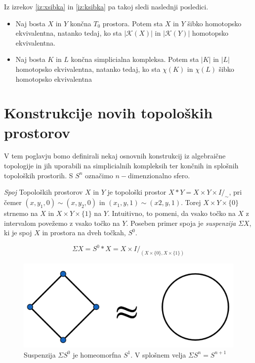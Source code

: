 \documentclass[mat1]{fmfdelo}
\begin{document}
Iz izrekov \ref{iz:xsibka} in \ref{iz:ksibka} pa takoj sledi naslednji posledici.

\begin{posledica}
    \begin{itemize}

        \item Naj bosta $X$ in $Y$ končna $T_0$ prostora. Potem sta $X$ in $Y$ šibko homotopsko ekvivalentna, natanko tedaj, ko sta $|\mathcal{K}(X)|$ in $|\mathcal{K}(Y)|$ homotopsko ekvivalentna.
        \item Naj bosta $K$ in $L$ končna simplicialna kompleksa. Potem sta $|K|$ in $|L|$ homotopsko ekvivalentna, natanko tedaj, ko sta $\chi(K)$ in $\chi(L)$ šibko homotopsko ekvivalentna
    \end{itemize}
\end{posledica}

\section{Konstrukcije novih topoloških prostorov}


V tem poglavju bomo definirali nekaj osnovnih konstrukcij iz algebraične topologije in jih uporabili na simplicialnih kompleksih ter končnih in splošnih topoloških prostorih. S $S^n$ označimo $n-$dimenzionalno sfero.

\textit{Spoj} Topoloških prostorov $X$ in $Y$ je topološki prostor $X\ast Y = X\times Y 
\times I /_{\sim}$, pri čemer $(x, y_1, 0) \sim (x, y_2, 0)$ in  $(x_1, y, 1) \sim (x2, y, 1)$. 
Torej $X\times Y\times \{0\}$ strnemo na $X$ in $X\times Y\times \{1\}$ na $Y$. Intuitivno, 
to pomeni, da vsako točko na $X$ z intervalom povežemo z vsako točko na $Y$.
Poseben primer spoja je \textit{suspenzija} $\Sigma X$, ki je spoj $X$ in prostora na dveh točkah, $S^0$.

$$
\Sigma X=S^0\ast X = X\times I /_{(X\times \{0\},X\times \{1\})}
$$

\begin{figure}[h]
    \centering
    \includegraphics[width=0.6\linewidth]{homeo2.png}
    \caption{Suspenzija $\Sigma S^0$ je homeomorfna $S^1$. V splošnem velja $\Sigma S^n=S^{n+1}$}
\end{figure}
\end{document}
